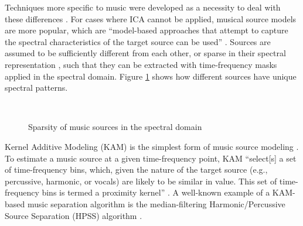 \documentclass[report.tex]{subfiles}
\begin{document}
Techniques more specific to music were developed as a necessity to deal with these differences \parencite{musicseptechniques1, musicseptechniques2}. For cases where ICA cannot be applied, musical source models are more popular, which are ``model-based approaches that attempt to capture the spectral characteristics of the target source can be used'' \parencite[36]{musicsepgood}. Sources are assumed to be sufficiently different from each other, or sparse in their spectral representation \parencite{musicsepgood}, such that they can be extracted with time-frequency masks applied in the spectral domain. Figure \ref{fig:sepgood} shows how different sources have unique spectral patterns.

\begin{figure}[ht]
	\centering
	\\
	\caption{Sparsity of music sources in the spectral domain \parencite[32]{musicsepgood}}
\label{fig:sepgood}
\end{figure}

Kernel Additive Modeling (KAM) is the simplest form of music source modeling \parencite{musicsepgood}. To estimate a music source at a given time-frequency point, KAM ``select[s] a set of time-frequency bins, which, given the nature of the target source (e.g., percussive, harmonic, or vocals) are likely to be similar in value. This set of time-frequency bins is termed a proximity kernel'' \parencite[36]{musicsepgood}. A well-known example of a KAM-based music separation algorithm is the median-filtering Harmonic/Percussive Source Separation (HPSS) algorithm \parencite{fitzgerald1}.
\end{document}
